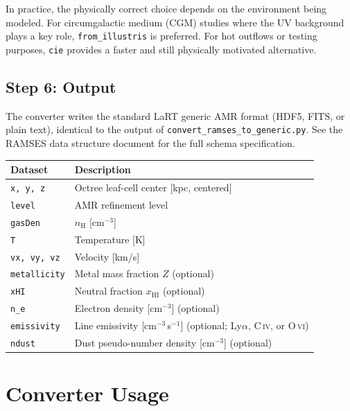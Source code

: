\documentclass[english,a4paper]{my_memo}
\begin{document}
In practice, the physically correct choice depends on the environment
being modeled.  For circumgalactic medium (CGM) studies where the UV
background plays a key role, \texttt{from\_illustris} is preferred.
For hot outflows or testing purposes, \texttt{cie} provides a faster
and still physically motivated alternative.

\subsection{Step 6: Output}

The converter writes the standard LaRT generic AMR format (HDF5, FITS,
or plain text), identical to the output of
\texttt{convert\_ramses\_to\_generic.py}.  See the RAMSES data structure
document for the full schema specification.

\begin{center}
\begin{tabular}{lp{9cm}}
\toprule
\textbf{Dataset} & \textbf{Description} \\
\midrule
\texttt{x, y, z}    & Octree leaf-cell center [kpc, centered] \\
\texttt{level}       & AMR refinement level \\
\texttt{gasDen}      & $n_\mathrm{H}$ [cm$^{-3}$] \\
\texttt{T}           & Temperature [K] \\
\texttt{vx, vy, vz}  & Velocity [km/s] \\
\texttt{metallicity} & Metal mass fraction $Z$ (optional) \\
\texttt{xHI}         & Neutral fraction $x_\mathrm{HI}$ (optional) \\
\texttt{n\_e}        & Electron density [cm$^{-3}$] (optional) \\
\texttt{emissivity}  & Line emissivity [cm$^{-3}$\,s$^{-1}$] (optional; Ly$\alpha$, C\,\textsc{iv}, or O\,\textsc{vi}) \\
\texttt{ndust}       & Dust pseudo-number density [cm$^{-3}$] (optional) \\
\bottomrule
\end{tabular}
\end{center}

\section{Converter Usage}
\label{sec:usage}
\end{document}
